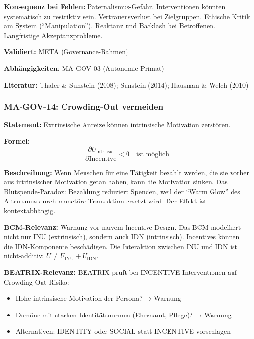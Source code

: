 \textbf{Konsequenz bei Fehlen:}
Paternalismus-Gefahr. Interventionen könnten systematisch zu restriktiv sein. Vertrauensverlust bei Zielgruppen. Ethische Kritik am System (``Manipulation''). Reaktanz und Backlash bei Betroffenen. Langfristige Akzeptanzprobleme.

\textbf{Validiert:} META (Governance-Rahmen)

\textbf{Abhängigkeiten:} MA-GOV-03 (Autonomie-Primat)

\textbf{Literatur:} Thaler \& Sunstein (2008); Sunstein (2014); Hausman \& Welch (2010)


\subsubsection*{MA-GOV-14: Crowding-Out vermeiden}

\textbf{Statement:} Extrinsische Anreize können intrinsische Motivation zerstören.

\textbf{Formel:}
\begin{equation}
\frac{\partial U_{\text{intrinsic}}}{\partial \text{Incentive}} < 0 \quad \text{ist möglich}
\end{equation}

\textbf{Beschreibung:}
Wenn Menschen für eine Tätigkeit bezahlt werden, die sie vorher aus intrinsischer Motivation getan haben, kann die Motivation sinken. Das Blutspende-Paradox: Bezahlung reduziert Spenden, weil der ``Warm Glow'' des Altruismus durch monetäre Transaktion ersetzt wird. Der Effekt ist kontextabhängig.

\textbf{BCM-Relevanz:}
Warnung vor naivem Incentive-Design. Das BCM modelliert nicht nur INU (extrinsisch), sondern auch IDN (intrinsisch). Incentives können die IDN-Komponente beschädigen. Die Interaktion zwischen INU und IDN ist nicht-additiv: $U \neq U_{\text{INU}} + U_{\text{IDN}}$.

\textbf{BEATRIX-Relevanz:}
BEATRIX prüft bei INCENTIVE-Interventionen auf Crowding-Out-Risiko:
\begin{itemize}
    \item Hohe intrinsische Motivation der Persona? → Warnung
    \item Domäne mit starken Identitätsnormen (Ehrenamt, Pflege)? → Warnung
    \item Alternativen: IDENTITY oder SOCIAL statt INCENTIVE vorschlagen
\end{itemize}

